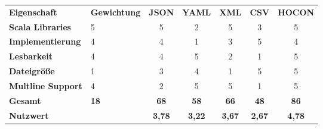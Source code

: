 \begin{tabularx}{\textwidth}{XXccccc}
\rowcolor{heading}\textbf{Eigenschaft} & \textbf{Gewichtung} & \textbf{JSON} & \textbf{YAML} & \textbf{XML} & \textbf{CSV} & \textbf{HOCON} \\
\textbf{Scala Libraries} & 5 & 5 & 2 & 5 & 3 & 5\\
\rowcolor{odd}\textbf{Implementierung} & 4 & 4 & 1 & 3 & 5 & 4\\
\textbf{Lesbarkeit} & 4 & 4 & 5 & 2 & 1 & 5\\
\rowcolor{odd}\textbf{Dateigröße} & 1 & 3 & 4 & 1 & 5 & 5 \\
\textbf{Multline Support} & 4 & 2 & 5 & 5 & 1 & 5 \\
\hline
\hline
\rowcolor{heading}\textbf{Gesamt} & \textbf{18} & \textbf{68} & \textbf{58} & \textbf{66} & \textbf{48} & \textbf{86} \\
\rowcolor{odd}\textbf{Nutzwert} & & \textbf{3,78} & \textbf{3,22} & \textbf{3,67} & \textbf{2,67} & \textbf{4,78} \\

\end{tabularx}